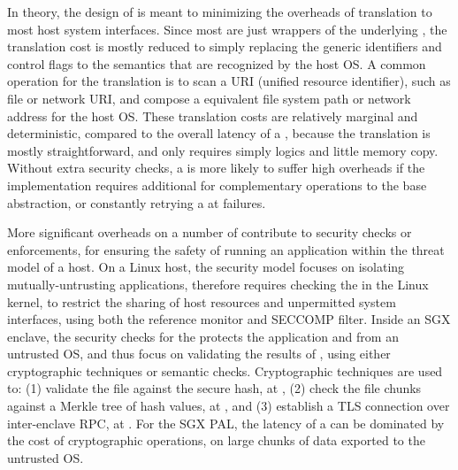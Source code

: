 In theory, the design of \thehostabi{}
is meant to minimizing the overheads of translation to most host system interfaces.
Since most \hostapis{} are just wrappers
of the underlying \linuxapis{},
the translation cost is mostly reduced to simply replacing the generic identifiers and control flags
to the semantics that are recognized by the host OS.
A common operation
for the translation is to scan a URI (unified resource identifier), such as file or network URI,
and compose a equivalent file system path or network address
for the host OS.
These translation costs
are relatively marginal and deterministic, compared to the overall latency of a \hostapi{},
because the translation is mostly straightforward,
and only requires simply logics
and little memory copy.
Without extra security checks,
a \hostapi{} is more likely to suffer high overheads if the implementation
requires additional \linuxapis{} for complementary operations
to the base abstraction,
or constantly retrying a \linuxapis{} at failures.



More significant overheads
on a number of \hostapis{} contribute to security checks or enforcements,
for ensuring the safety of running an application
within the threat model
of a host.
On a Linux host, the security model
focuses on isolating mutually-untrusting applications,
therefore requires checking
the \hostapis{} in the Linux kernel,
to restrict the sharing of host resources and unpermitted system interfaces,
using both the reference monitor and SECCOMP filter.
Inside an SGX enclave, the security checks
for the \hostapis{}
protects the application and \libos{} from an untrusted OS,
and thus focus on validating the results of \linuxapis{},
using either cryptographic techniques or semantic checks.
Cryptographic techniques are used to: (1) validate the file against the secure hash, at , (2) check the file chunks against a Merkle tree of hash values, at , and (3) establish a TLS connection over inter-enclave RPC, at .
For the SGX PAL,
the latency of a \hostapi{} can be dominated
by the cost of cryptographic operations,
on large chunks of data exported to the untrusted OS.


